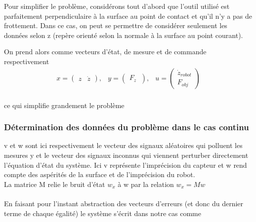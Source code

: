 \documentclass[12pt,twoside,a4paper]{article}
\begin{document}
Pour simplifier le problème, considérons tout d'abord que l'outil utilisé est parfaitement perpendiculaire à la surface au point de contact et qu'il n'y a pas de frottement. Dans ce cas, on peut se permettre de considérer seulement les données selon z (repère orienté selon la normale à la surface au point courant).

On prend alors comme vecteurs d'état, de mesure et de commande respectivement
$$
\begin{array}{ccc}
x =  \begin{pmatrix} z & \dot{z} \end{pmatrix} 
,   & 
y= \begin{pmatrix}
 F_z \
\end{pmatrix},   &
u = \begin{pmatrix} \dot{z}_{robot} \\ F_{obj}\end{pmatrix} \\
\end{array}
$$

ce qui simplifie grandement le problème

\subsubsection{Détermination des données du problème dans le cas continu}


v et w sont ici respectivement le vecteur des signaux aléatoires qui polluent les mesures y et le vecteur  des signaux inconnus qui viennent perturber directement l'équation d'état du système. Ici  v représente l'imprécision du capteur et w rend compte des aspérités de la surface et de l'imprécision du robot. \\
La matrice M relie le bruit d'état $w_x$ à w par la relation $w_x = Mw$ \\
\vspace {1cm} \\
En faisant pour l'instant abstraction des vecteurs d'erreurs (et donc du dernier terme de chaque égalité) le système s'écrit dans notre cas comme  
\end{document}
